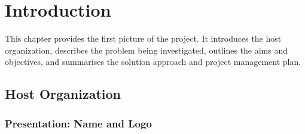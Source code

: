 
\chapter{Introduction} %
\label{ch:into}

This chapter provides the first picture of the project. It introduces the host 
organization, describes the problem being investigated, outlines the aims and 
objectives, and summarises the solution approach and project management plan.

\section{Host Organization}
\label{sec:host_org}

\subsection{Presentation: Name and Logo}

